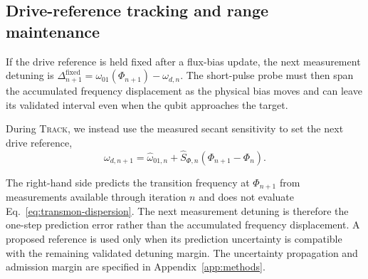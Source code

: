 


\subsection{Drive-reference tracking and range maintenance}
\label{sec:drive-tracking}



If the drive reference is held fixed after a flux-bias update, the next
measurement detuning is
$\Delta_{n+1}^{\mathrm{fixed}}
=\omega_{01}(\Phi_{n+1})-\omega_{d,n}$.
The short-pulse probe must then span the accumulated frequency displacement
as the physical bias moves and can leave its validated interval even when the
qubit approaches the target.

During \textsc{Track}, we instead use the measured secant sensitivity to set
the next drive reference,
%
\begin{equation}
\omega_{d,n+1}
=
\widehat\omega_{01,n}
+
\widehat S_{\Phi,n}
\left(
\Phi_{n+1}-\Phi_n
\right).
\label{eq:drive-tracking}
\end{equation}
%

The right-hand side predicts the transition frequency at $\Phi_{n+1}$ from
measurements available through iteration $n$ and does not evaluate
Eq.~\eqref{eq:transmon-dispersion}. The next measurement detuning is therefore
the one-step prediction error rather than the accumulated frequency
displacement. A proposed reference is used only when its prediction
uncertainty is compatible with the remaining validated detuning margin. The
uncertainty propagation and admission margin are specified in
Appendix~\ref{app:methods}.

